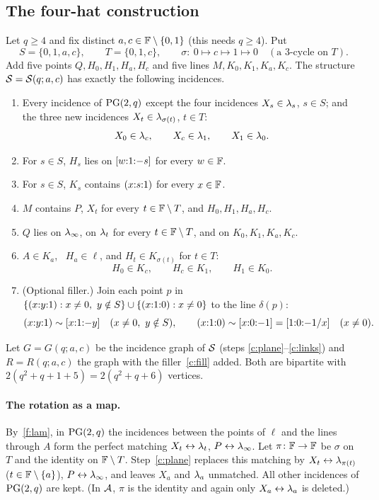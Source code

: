 \subsection{The four-hat construction}\label{ssec:four}
Let $q \ge 4$ and fix distinct $a, c \in \mathbb{F} \setminus \{0,1\}$ (this needs $q \ge 4$). Put
\[
S = \{0, 1, a, c\}, \qquad T = \{0, 1, c\}, \qquad \sigma\colon\ 0 \mapsto c \mapsto 1 \mapsto 0 \quad (\text{a $3$-cycle on } T).
\]
Add five points $Q, H_0, H_1, H_a, H_c$ and five lines $M, K_0, K_1, K_a, K_c$. The structure $\mathcal{S} = \mathcal{S}(q;a,c)$ has exactly the following incidences.
\begin{enumerate}[label=\textup{(C\arabic*)},leftmargin=3em]
\item\label{c:plane} Every incidence of $\mathrm{PG}(2,q)$ except the four incidences $X_s \in \lambda_s$, $s \in S$; and the three new incidences $X_t \in \lambda_{\sigma(t)}$, $t \in T$:
\[
X_0 \in \lambda_c, \qquad X_c \in \lambda_1, \qquad X_1 \in \lambda_0 .
\]
\item\label{c:hat} For $s \in S$, $H_s$ lies on $[{w}{:}{1}{:}{-s}]$ for every $w \in \mathbb{F}$.
\item\label{c:hatline} For $s \in S$, $K_s$ contains $({x}{:}{s}{:}{1})$ for every $x \in \mathbb{F}$.
\item\label{c:M} $M$ contains $P$, $X_t$ for every $t \in \mathbb{F} \setminus T$, and $H_0, H_1, H_a, H_c$.
\item\label{c:Q} $Q$ lies on $\lambda_\infty$, on $\lambda_t$ for every $t \in \mathbb{F} \setminus T$, and on $K_0, K_1, K_a, K_c$.
\item\label{c:links} $A \in K_a$, \ $H_a \in \ell$, and $H_t \in K_{\sigma(t)}$ for $t \in T$:
\[
H_0 \in K_c, \qquad H_c \in K_1, \qquad H_1 \in K_0 .
\]
\item\label{c:fill} \textup{(Optional filler.)} Join each point $p$ in $\{({x}{:}{y}{:}{1}) : x \neq 0,\ y \notin S\} \cup \{({x}{:}{1}{:}{0}) : x \neq 0\}$ to the line $\delta(p)$:
\[
\pnt xy1 \sim \lin x1{-y} \quad (x \ne 0,\ y \notin S), \qquad \pnt x10 \sim \lin x0{-1} = \lin 10{-1/x} \quad (x \neq 0).
\]
\end{enumerate}
Let $G = G(q;a,c)$ be the incidence graph of $\mathcal{S}$ (steps \ref{c:plane}--\ref{c:links}) and $R = R(q;a,c)$ the graph with the filler~\ref{c:fill} added. Both are bipartite with $2(q^2+q+1+5) = 2(q^2+q+6)$ vertices.

\paragraph{The rotation as a map.} By~\ref{f:lam}, in $\mathrm{PG}(2,q)$ the incidences between the points of $\ell$ and the lines through $A$ form the perfect matching $X_t \leftrightarrow \lambda_t$, $P \leftrightarrow \lambda_\infty$. Let $\pi\colon \mathbb{F} \to \mathbb{F}$ be $\sigma$ on $T$ and the identity on $\mathbb{F} \setminus T$. Step~\ref{c:plane} replaces this matching by $X_t \leftrightarrow \lambda_{\pi(t)}$ ($t \in \mathbb{F} \setminus \{a\}$), $P \leftrightarrow \lambda_\infty$, and leaves $X_a$ and $\lambda_a$ unmatched. All other incidences of $\mathrm{PG}(2,q)$ are kept. (In $\mathcal{A}$, $\pi$ is the identity and again only $X_a \leftrightarrow \lambda_a$ is deleted.)

